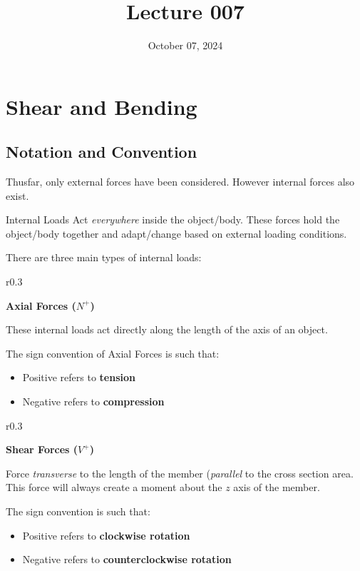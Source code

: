 \documentclass[12pt]{article}
\title{Lecture 007}
\date{October 07, 2024}
\begin{document}
\newpage
\section{Shear and Bending}
\label{sec:shearAndBending}

\subsection{Notation and Convention}
\label{ssec:notationAndConvention}

Thusfar, only external forces have been considered. However internal forces also exist.
\begin{definition}{Internal Loads}
  Act \textit{everywhere} inside the object/body. These forces hold the object/body together
  and adapt/change based on external loading conditions.
\end{definition}
There are three main types of internal loads:

\begin{wrapfigure}[3]{r}{0.3\textwidth}
  \vspace{-10pt}
  \centering
  
  \label{fig:020}
\end{wrapfigure}
\begin{center}
  {\large \textbf{Axial Forces ($N^+$)}}
\end{center}
These internal loads act directly along the length of the axis of an object.

The sign convention of Axial Forces is such that:
\begin{itemize}
  \itemsep0em
  \item Positive refers to \textbf{tension}
  \item Negative refers to \textbf{compression}
\end{itemize}

\begin{wrapfigure}[3]{r}{0.3\textwidth}
  \vspace{-20pt}
  \centering
  
  \label{fig:021}
\end{wrapfigure}
\begin{center}
  {\large \textbf{Shear Forces ($V^+$)}}
\end{center}
Force \textit{transverse} to the length of the member (\textit{parallel} to the cross section area.
This force will always create a moment about the $z$ axis of the member. 

The sign convention is such that:
\begin{itemize}
  \itemsep0em
  \item Positive refers to \textbf{clockwise rotation}
  \item Negative refers to \textbf{counterclockwise rotation}
\end{itemize}
\end{document}
